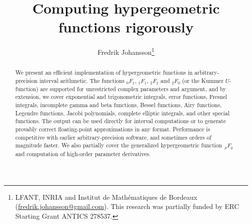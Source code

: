 \documentclass[11pt]{article}
\begin{document}
\title{Computing hypergeometric functions rigorously}


\author{Fredrik Johansson\footnote{LFANT, INRIA and Institut de Math\'{e}matiques de Bordeaux (\protect\url{fredrik.johansson@gmail.com}).
  This research was partially funded by ERC Starting Grant ANTICS 278537.}}

\date{}

\maketitle

\begin{abstract}
We present an efficient implementation of hypergeometric functions
in arbitrary-precision interval arithmetic.
The functions ${}_0F_1$, ${}_1F_1$, ${}_2F_1$ and ${}_2F_0$
(or the Kummer $U$-function) are supported
for unrestricted complex parameters and argument,
and by extension,
we cover
exponential and trigonometric integrals, error functions, Fresnel integrals,
incomplete gamma and beta functions, Bessel functions, Airy functions,
Legendre functions, Jacobi polynomials,
complete elliptic integrals, and other special functions.
The output can be used directly for interval computations
or to generate provably correct floating-point approximations in any format.
Performance is competitive with earlier arbitrary-precision software, and
sometimes orders of magnitude faster.
We also partially cover the generalized hypergeometric function~${}_pF_q$
and computation of high-order parameter derivatives.
\end{abstract}


\end{document}
